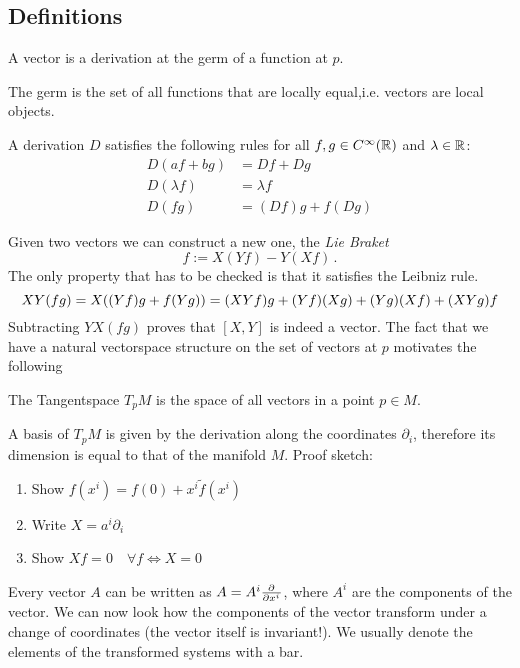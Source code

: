 \subsection*{Definitions}
\begin{definition}
A vector is a derivation at the germ of a function at $p$.
\end{definition}
The germ is the set of all functions that are locally equal,i.e. vectors are local objects.
\begin{definition}[Derivation]
A derivation $D$ satisfies the following rules for all $f,g\in C^\infty(\mathbb{R})$ and $\lambda \in \mathbb{R}$:
\begin{align}
    D(af+bg) &=Df+Dg\\
    D(\lambda f)&=\lambda f\\
    D(fg)&= (Df)g+f(Dg)
\end{align}
\end{definition}
Given two vectors we can construct a new one, the \emph{Lie Braket}
\begin{equation}
    [X,Y]f:=X(Yf)-Y(Xf)\, .
\end{equation}
The only property that has to be checked is that it satisfies the Leibniz rule.
\begin{equation}
    XY(fg)=X((Yf)g+f(Yg))=(XYf)g+(Yf)(Xg)+(Yg)(Xf)+(XYg)f\\
\end{equation}
Subtracting $YX(fg)$ proves that $[X,Y]$ is indeed a vector. The fact that we
have a natural vectorspace structure on the set of vectors at $p$ motivates the
following
\begin{definition}
The Tangentspace $T_pM$ is the space of all vectors in a point $p\in M$.
\end{definition}
A basis of $T_pM$ is given by the derivation along the
coordinates $\partial_i$, therefore its dimension is equal to that of the manifold $M$.
Proof sketch:
\begin{enumerate}
    \item Show $f(x^i)=f(0)+x^i\tilde{f}(x^i)$
    \item Write $X=a^i\partial_i$
    \item Show $Xf=0\quad \forall f \iff X=0$
\end{enumerate}
Every vector $A$ can be written as $A=A^i\pd{}{{x^i}}$, where $A^i$ are the
components of the vector. We can now look how the components of the vector
transform under a change of coordinates (the vector itself is invariant!). 
We usually denote the elements of the transformed systems with a bar.
